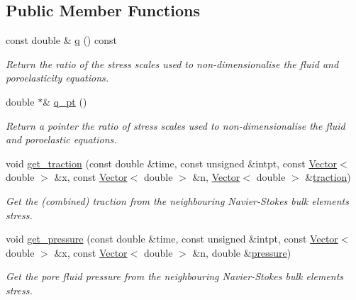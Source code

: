 \subsection*{Public Member Functions}
\begin{DoxyCompactItemize}
\item 
const double \& \hyperlink{classoomph_1_1FSILinearisedAxisymPoroelasticTractionElement_af029ed86314e64e5fd89123dab66b155}{q} () const
\begin{DoxyCompactList}\small\item\em Return the ratio of the stress scales used to non-\/dimensionalise the fluid and poroelasticity equations. \end{DoxyCompactList}\item 
double $\ast$\& \hyperlink{classoomph_1_1FSILinearisedAxisymPoroelasticTractionElement_ad85aab8cd80c10998abd46347f4da2a4}{q\+\_\+pt} ()
\begin{DoxyCompactList}\small\item\em Return a pointer the ratio of stress scales used to non-\/dimensionalise the fluid and poroelastic equations. \end{DoxyCompactList}\item 
void \hyperlink{classoomph_1_1FSILinearisedAxisymPoroelasticTractionElement_ace2d9e5b5f0fbea991a95b5e1c0f7b80}{get\+\_\+traction} (const double \&time, const unsigned \&intpt, const \hyperlink{classoomph_1_1Vector}{Vector}$<$ double $>$ \&x, const \hyperlink{classoomph_1_1Vector}{Vector}$<$ double $>$ \&n, \hyperlink{classoomph_1_1Vector}{Vector}$<$ double $>$ \&\hyperlink{classoomph_1_1AxisymmetricPoroelasticityTractionElement_abb8e937540df8384b6129793497f1e50}{traction})
\begin{DoxyCompactList}\small\item\em Get the (combined) traction from the neighbouring Navier-\/\+Stokes bulk element\textquotesingle{}s stress. \end{DoxyCompactList}\item 
void \hyperlink{classoomph_1_1FSILinearisedAxisymPoroelasticTractionElement_a400115007925a62448e741cad2697472}{get\+\_\+pressure} (const double \&time, const unsigned \&intpt, const \hyperlink{classoomph_1_1Vector}{Vector}$<$ double $>$ \&x, const \hyperlink{classoomph_1_1Vector}{Vector}$<$ double $>$ \&n, double \&\hyperlink{classoomph_1_1AxisymmetricPoroelasticityTractionElement_a9d0a69336be18e1a62450c5c8872777b}{pressure})
\begin{DoxyCompactList}\small\item\em Get the pore fluid pressure from the neighbouring Navier-\/\+Stokes bulk element\textquotesingle{}s stress. \end{DoxyCompactList}\item 

\end{DoxyCompactItemize}
